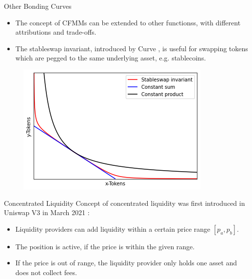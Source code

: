 \documentclass[]{beamer}
\begin{document}
\begin{frame}{Other Bonding Curves}

\begin{small}
\begin{itemize}
	\item The concept of CFMMs can be extended to other functionss, with different attributions and trade-offs. 
	\item The stableswap invariant, introduced by Curve \cite{CRV}, is useful for swapping tokens which are pegged to the same underlying asset, e.g. stablecoins.
	\end{itemize}
\end{small}

	\begin{figure}
		\includegraphics[scale=0.6]{../assets/images/bonding-curves.png}
	\end{figure}
	
\end{frame}


\begin{frame}{Concentrated Liquidity}
	Concept of concentrated liquidity was first introduced in Uniswap V3 in March 2021 \cite{UNIV3}:
	\begin{itemize}
		\item<2-> Liquidity providers can add liquidity within a certain price range $[p_a, p_b]$.
		\item<3-> The position is active, if the price is within the given range. %
		\item<4-> If the price is out of range, the liquidity provider only holds one asset and does not collect fees.
	\end{itemize}
	\vspace{0.5cm}
\end{frame}
\end{document}
